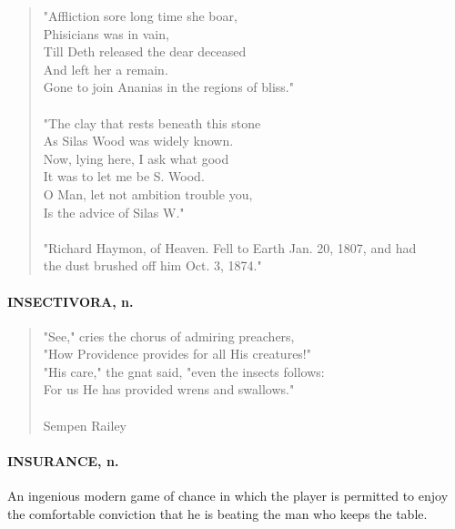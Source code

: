 \documentclass[11pt]{article}
\begin{document}
\begin{quote}       "Affliction sore long time she boar, \\
          Phisicians was in vain, \\
      Till Deth released the dear deceased \\
          And left her a remain. \\
  Gone to join Ananias in the regions of bliss." \\
 \\
  "The clay that rests beneath this stone \\
  As Silas Wood was widely known. \\
  Now, lying here, I ask what good \\
  It was to let me be S. Wood. \\
  O Man, let not ambition trouble you, \\
  Is the advice of Silas W." \\
 \\
  "Richard Haymon, of Heaven.  Fell to Earth Jan. 20, 1807, and had \\
the dust brushed off him Oct. 3, 1874." \end{quote}

\paragraph{INSECTIVORA, n.}

\begin{quote}   "See," cries the chorus of admiring preachers, \\
  "How Providence provides for all His creatures!" \\
  "His care," the gnat said, "even the insects follows: \\
  For us He has provided wrens and swallows." \\
 \\
Sempen Railey \end{quote}


\paragraph{INSURANCE, n.}  An ingenious modern game of chance in which the player
is permitted to enjoy the comfortable conviction that he is beating
the man who keeps the table.
\end{document}
